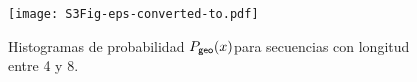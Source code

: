 \begin{figure}[htpb]
    \centering
    \hbox{\hspace{-2.5em}\texttt{[image: S3Fig-eps-converted-to.pdf]}}
    \caption{Histogramas de probabilidad $P_{{\sf geo}}(x)$para secuencias con longitud entre 4 y 8.}
    \label{S3_Fig}
\end{figure}